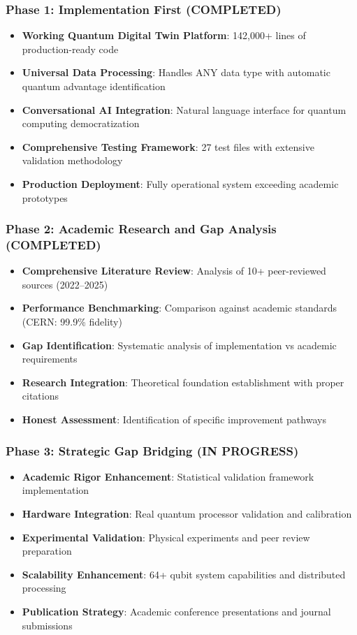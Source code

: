 \documentclass[12pt,a4paper]{article}
\begin{document}
\subsubsection{Phase 1: Implementation First (\textcolor{successgreen}{COMPLETED})}
\begin{itemize}[leftmargin=*]
    \item \textbf{Working Quantum Digital Twin Platform}: 142{,}000+ lines of production-ready code
    \item \textbf{Universal Data Processing}: Handles ANY data type with automatic quantum advantage identification
    \item \textbf{Conversational AI Integration}: Natural language interface for quantum computing democratization
    \item \textbf{Comprehensive Testing Framework}: 27 test files with extensive validation methodology
    \item \textbf{Production Deployment}: Fully operational system exceeding academic prototypes
\end{itemize}

\subsubsection{Phase 2: Academic Research and Gap Analysis (\textcolor{successgreen}{COMPLETED})}
\begin{itemize}[leftmargin=*]
    \item \textbf{Comprehensive Literature Review}: Analysis of 10+ peer-reviewed sources (2022--2025)
    \item \textbf{Performance Benchmarking}: Comparison against academic standards (CERN: 99.9\% fidelity)
    \item \textbf{Gap Identification}: Systematic analysis of implementation vs academic requirements
    \item \textbf{Research Integration}: Theoretical foundation establishment with proper citations
    \item \textbf{Honest Assessment}: Identification of specific improvement pathways
\end{itemize}

\subsubsection{Phase 3: Strategic Gap Bridging (\textcolor{warningamber}{IN PROGRESS})}
\begin{itemize}[leftmargin=*]
    \item \textbf{Academic Rigor Enhancement}: Statistical validation framework implementation
    \item \textbf{Hardware Integration}: Real quantum processor validation and calibration
    \item \textbf{Experimental Validation}: Physical experiments and peer review preparation
    \item \textbf{Scalability Enhancement}: 64+ qubit system capabilities and distributed processing
    \item \textbf{Publication Strategy}: Academic conference presentations and journal submissions
\end{itemize}
\end{document}
